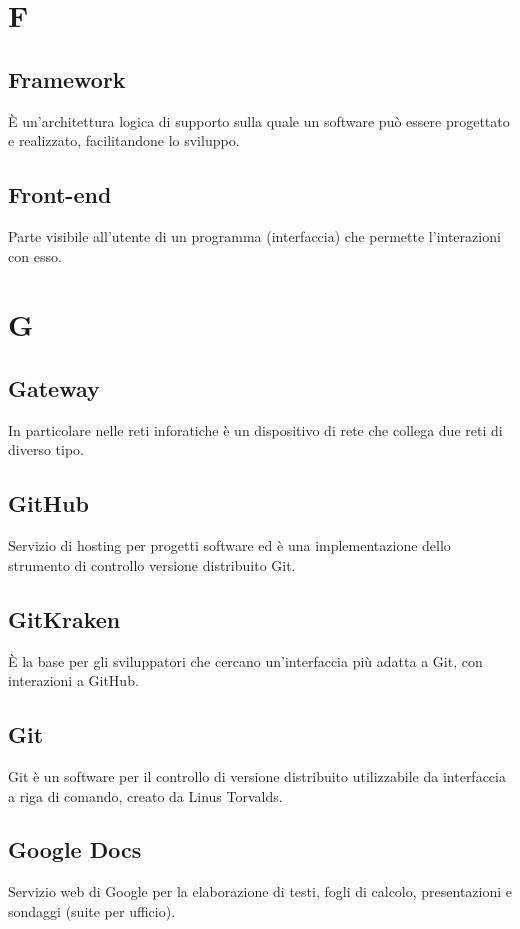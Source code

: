 \documentclass{classes/base}
\begin{document}
        \newpage  
    \section{F}
        \subsection*{Framework}
        È un'architettura logica di supporto sulla quale un software può essere progettato e realizzato, facilitandone lo sviluppo.
        
        \subsection*{Front-end}
        Parte visibile all'utente di un programma (interfaccia) che permette l'interazioni con esso.
        
        \newpage  
    \section{G}
        
        \subsection*{Gateway}
        In particolare nelle reti inforatiche è un dispositivo di rete che collega due reti di diverso tipo.

        \subsection*{GitHub}
        Servizio di hosting per progetti software ed è una implementazione dello strumento di controllo versione distribuito Git.

        \subsection*{GitKraken}
        È la base per gli sviluppatori che cercano un'interfaccia più adatta a Git, con interazioni a GitHub. 

        \subsection*{Git}
        Git è un software per il controllo di versione distribuito utilizzabile da interfaccia a riga di comando, creato da Linus Torvalds.
        
        \subsection*{Google Docs}
        Servizio web di Google per la elaborazione di testi, fogli di calcolo, presentazioni e sondaggi (suite per ufficio).
        
\end{document}
